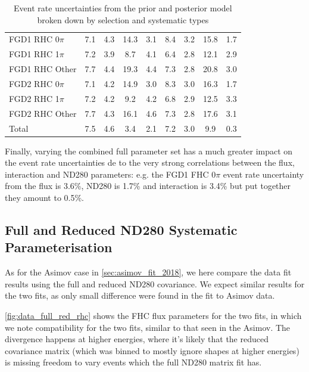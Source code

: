 \begin{table}
\begin{tabular}{l | c c | c c | c c | c c}
		\hline
		FGD1 \numu RHC 0$\pi$ & 7.1 & 4.3 & 14.3 & 3.1 & 8.4 & 3.2 & 15.8 & 1.7 \\
		FGD1 \numu RHC 1$\pi$ & 7.2 & 3.9 & 8.7 & 4.1 & 6.4 & 2.8 & 12.1 & 2.9 \\
		FGD1 \numu RHC Other & 7.7 & 4.4 & 19.3 & 4.4 & 7.3 & 2.8 & 20.8 & 3.0 \\
		FGD2 \numu RHC 0$\pi$ & 7.1 & 4.2 & 14.9 & 3.0 & 8.3 & 3.0 & 16.3 & 1.7 \\
		FGD2 \numu RHC 1$\pi$ & 7.2 & 4.2 & 9.2 & 4.2 & 6.8 & 2.9 & 12.5 & 3.3 \\
		FGD2 \numu RHC Other & 7.7 & 4.3 & 16.1 & 4.6 & 7.3 & 2.8 & 17.6 & 3.1 \\
		\hline
		Total & 7.5 & 4.6 & 3.4 & 2.1 & 7.2 & 3.0 & 9.9 & 0.3 \\
		\hline
		\hline
	\end{tabular}
	\caption{Event rate uncertainties from the prior and posterior model broken down by selection and systematic types}
	\label{tab:2018_syst_uncertain}
\end{table}

Finally, varying the combined full parameter set has a much greater impact on the event rate uncertainties de to the very strong correlations between the flux, interaction and ND280 parameters: e.g. the FGD1 FHC 0$\pi$ event rate uncertainty from the flux is 3.6\%, ND280 is 1.7\% and interaction is 3.4\% but put together they amount to 0.5\%.

\subsection{Full and Reduced ND280 Systematic Parameterisation}
As for the Asimov case in \autoref{sec:asimov_fit_2018}, we here compare the data fit results using the full and reduced ND280 covariance. We expect similar results for the two fits, as only small difference were found in the fit to Asimov data.

\autoref{fig:data_full_red_rhc} shows the FHC flux parameters for the two fits, in which we note compatibility for the two fits, similar to that seen in the Asimov. The divergence happens at higher energies, where it's likely that the reduced covariance matrix (which was binned to mostly ignore shapes at higher energies) is missing freedom to vary events which the full ND280 matrix fit has.

